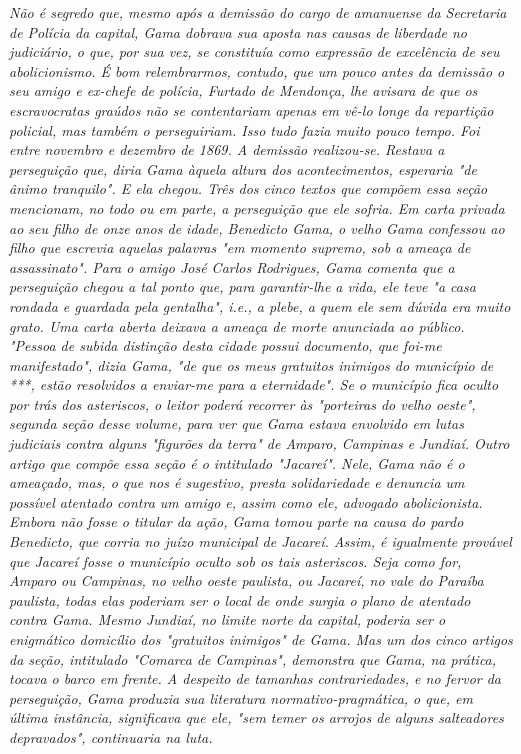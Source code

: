 \emph{Não é segredo que, mesmo após a demissão do cargo de amanuense da
Secretaria de Polícia da capital, Gama dobrava sua aposta nas causas de
liberdade no judiciário, o que, por sua vez, se constituía como
expressão de excelência de seu abolicionismo. É bom relembrarmos,
contudo, que um pouco antes da demissão o seu amigo e ex-chefe de
polícia, Furtado de Mendonça, lhe avisara de que os escravocratas
graúdos não se contentariam apenas em vê-lo longe da repartição
policial, mas também o perseguiriam. Isso tudo fazia muito pouco tempo.
Foi entre novembro e dezembro de 1869. A demissão realizou-se. Restava a
perseguição que, diria Gama àquela altura dos acontecimentos, esperaria
"de ânimo tranquilo". E ela chegou. Três dos cinco textos que compõem
essa seção mencionam, no todo ou em parte, a perseguição que ele sofria.
Em carta privada ao seu filho de onze anos de idade, Benedicto Gama, o
velho Gama confessou ao filho que escrevia aquelas palavras "em momento
supremo, sob a ameaça de assassinato". Para o amigo José Carlos
Rodrigues, Gama comenta que a perseguição chegou a tal ponto que, para
garantir-lhe a vida, ele teve "a casa rondada e guardada pela gentalha",
i.e., a plebe, a quem ele sem dúvida era muito grato. Uma carta aberta
deixava a ameaça de morte anunciada ao público. "Pessoa de subida
distinção desta cidade possui documento, que foi-me manifestado", dizia
Gama, "de que os meus gratuitos inimigos do município de ***, estão
resolvidos a enviar-me para a eternidade". Se o município fica oculto
por trás dos asteriscos, o leitor poderá recorrer às "porteiras do velho
oeste", segunda seção desse volume, para ver que Gama estava envolvido
em lutas judiciais contra alguns "figurões da terra" de Amparo, Campinas
e Jundiaí. Outro artigo que compõe essa seção é o intitulado "Jacareí".
Nele, Gama não é o ameaçado, mas, o que nos é sugestivo, presta
solidariedade e denuncia um possível atentado contra um amigo e, assim
como ele, advogado abolicionista. Embora não fosse o titular da ação,
Gama tomou parte na causa do pardo Benedicto, que corria no juízo
municipal de Jacareí. Assim, é igualmente provável que Jacareí fosse o
município oculto sob os tais asteriscos. Seja como for, Amparo ou
Campinas, no velho oeste paulista, ou Jacareí, no vale do Paraíba
paulista, todas elas poderiam ser o local de onde surgia o plano de
atentado contra Gama. Mesmo Jundiaí, no limite norte da capital, poderia
ser o enigmático domicílio dos "gratuitos inimigos" de Gama. Mas um dos
cinco artigos da seção, intitulado "Comarca de Campinas", demonstra que
Gama, na prática, tocava o barco em frente. A despeito de tamanhas
contrariedades, e no fervor da perseguição, Gama produzia sua literatura
normativo-pragmática, o que, em última instância, significava que ele,
"sem temer os arrojos de alguns salteadores depravados", continuaria na
luta. }

